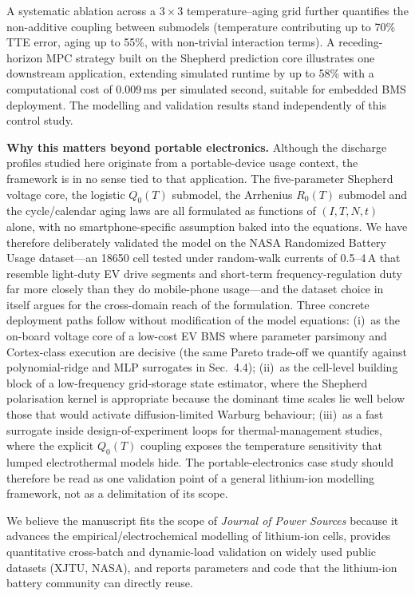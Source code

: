 \documentclass[12pt]{article}
\begin{document}
A systematic ablation across a $3{\times}3$ temperature--aging grid further quantifies the non-additive coupling between submodels (temperature contributing up to 70\% TTE error, aging up to 55\%, with non-trivial interaction terms).
A receding-horizon MPC strategy built on the Shepherd prediction core illustrates one downstream application, extending simulated runtime by up to 58\% with a computational cost of 0.009\,ms per simulated second, suitable for embedded BMS deployment.
The modelling and validation results stand independently of this control study.

\noindent\textbf{Why this matters beyond portable electronics.}
Although the discharge profiles studied here originate from a portable-device usage context, the framework is in no sense tied to that application.
The five-parameter Shepherd voltage core, the logistic $Q_0(T)$ submodel, the Arrhenius $R_0(T)$ submodel and the cycle/calendar aging laws are all formulated as functions of $(I, T, N, t)$ alone, with no smartphone-specific assumption baked into the equations.
We have therefore deliberately validated the model on the NASA Randomized Battery Usage dataset---an 18650 cell tested under random-walk currents of 0.5--4\,A that resemble light-duty EV drive segments and short-term frequency-regulation duty far more closely than they do mobile-phone usage---and the dataset choice in itself argues for the cross-domain reach of the formulation.
Three concrete deployment paths follow without modification of the model equations:
(i)~as the on-board voltage core of a low-cost EV BMS where parameter parsimony and Cortex-class execution are decisive (the same Pareto trade-off we quantify against polynomial-ridge and MLP surrogates in Sec.~4.4);
(ii)~as the cell-level building block of a low-frequency grid-storage state estimator, where the Shepherd polarisation kernel is appropriate because the dominant time scales lie well below those that would activate diffusion-limited Warburg behaviour;
(iii)~as a fast surrogate inside design-of-experiment loops for thermal-management studies, where the explicit $Q_0(T)$ coupling exposes the temperature sensitivity that lumped electrothermal models hide.
The portable-electronics case study should therefore be read as one validation point of a general lithium-ion modelling framework, not as a delimitation of its scope.

We believe the manuscript fits the scope of \emph{Journal of Power Sources} because it advances the empirical/electrochemical modelling of lithium-ion cells, provides quantitative cross-batch and dynamic-load validation on widely used public datasets (XJTU, NASA), and reports parameters and code that the lithium-ion battery community can directly reuse.
\end{document}
